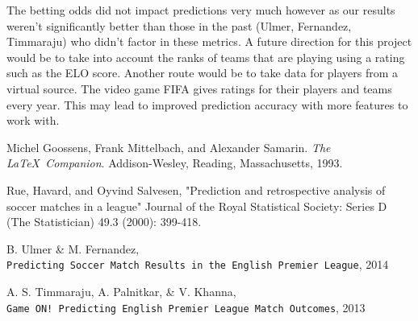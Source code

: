 \documentclass[paper=a4, fontsize=11pt]{scrartcl}
\numberwithin{equation}{section}		%
\numberwithin{figure}{section}			%
\numberwithin{table}{section}				%
\begin{document}
The betting odds did not impact predictions very much however as our results weren't significantly better than those in the past (Ulmer, Fernandez, Timmaraju) who didn't factor in these metrics. A future direction for this project would be to take into account the ranks of teams that are playing using a rating such as the ELO score. Another route would be to take data for players from a virtual source. The video game FIFA gives ratings for their players and teams every year. This may lead to improved prediction accuracy with more features to work with.


\begin{thebibliography}{9}
Michel Goossens, Frank Mittelbach, and Alexander Samarin. 
\textit{The \LaTeX\ Companion}. 
Addison-Wesley, Reading, Massachusetts, 1993.
 
Rue, Havard, and Oyvind Salvesen, "Prediction and retrospective analysis of soccer matches in a league" Journal of the Royal Statistical Society: Series D (The Statistician) 49.3 (2000): 399-418.
 
B. Ulmer \& M. Fernandez,
\\\texttt{Predicting Soccer Match Results in the English Premier League}, 2014

A. S. Timmaraju, A. Palnitkar, \& V. Khanna,
\\\texttt{Game ON! Predicting English Premier League Match Outcomes}, 2013
\end{thebibliography}






\end{document}
